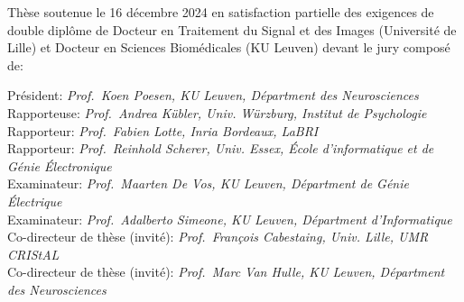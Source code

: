 {    \vfill


    \vfill
      Th\`ese soutenue le 16 d\'ecembre 2024 en satisfaction partielle des exigences de double
      dipl\^ome de Docteur en Traitement du Signal et des Images
      (Universit\'e de Lille) et Docteur en Sciences Biom\'edicales (KU Leuven)
      devant le jury compos\'e de: \\
      \smallskip

     Pr\'esident: \emph{Prof.\ Koen Poesen, KU Leuven, D\'epartment des Neurosciences} \\
      Rapporteuse: \emph{Prof.\ Andrea K\"ubler, Univ. W\"urzburg, Institut de Psychologie} \\
      Rapporteur: \emph{Prof.\ Fabien Lotte, Inria Bordeaux, LaBRI} \\
      Rapporteur: \emph{Prof.\ Reinhold Scherer, Univ. Essex, École d'informatique et de G\'enie \'Electronique} \\
      Examinateur: \emph{Prof.\ Maarten De Vos, KU Leuven,  D\'epartment de G\'enie \'Electrique} \\
      Examinateur: \emph{Prof.\ Adalberto Simeone, KU Leuven, D\'epartment d'Informatique} \\
      Co-directeur de th\`ese (invit\'e): \emph{Prof.\ François Cabestaing, Univ. Lille, UMR CRIStAL} \\
      Co-directeur de th\`ese (invit\'e): \emph{Prof.\ Marc Van Hulle, KU Leuven, D\'epartment des Neurosciences}

}
